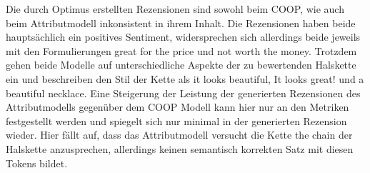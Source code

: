 Die durch Optimus erstellten Rezensionen sind sowohl beim COOP, wie auch beim Attributmodell inkonsistent in ihrem Inhalt. 
Die Rezensionen haben beide hauptsächlich ein positives Sentiment, widersprechen sich allerdings beide jeweils mit den Formulierungen \glqq{}great for the price\grqq{} und \glqq{}not worth the money\grqq{}.
Trotzdem gehen beide Modelle auf unterschiedliche Aspekte der zu bewertenden Halskette ein und beschreiben den Stil der Kette als \glqq{}it looks beautiful\grqq{}, \glqq{}It looks great!\grqq{} und \glqq{}a beautiful necklace\grqq{}.
Eine Steigerung der Leistung der generierten Rezensionen des Attributmodells gegenüber dem COOP Modell kann hier nur an den Metriken festgestellt werden und spiegelt sich nur minimal in der generierten Rezension wieder.
Hier fällt auf, dass das Attributmodell versucht die Kette \glqq{}the chain\grqq{} der Halskette anzusprechen, allerdings keinen semantisch korrekten Satz mit diesen Tokens bildet.

